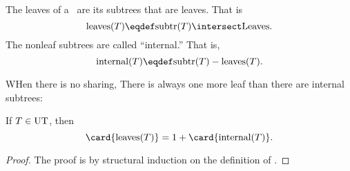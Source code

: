 The leaves of a \rectree\ are its subtrees that are leaves.  That is
\[
\text{leaves}(T) \eqdef \subtrees{T} \intersect \leafset.
\]
The nonleaf subtrees are called ``internal.''  That is,
\[
\text{internal}(T) \eqdef \subtrees{T} - \text{leaves}(T).
\]

WHen there is no sharing, There is always one more leaf than there are
internal subtrees:

\begin{lemma}\label{}
If $T \in \text{UT}$, then
\[
\card{\text{leaves}(T)} = 1 + \card{\text{internal}(T)}.
\]
\end{lemma}
\begin{proof}
The proof is by structural induction on the definition of \ubt.

\end{proof} 


\endinput
